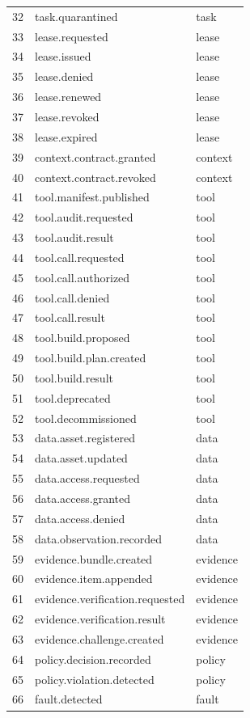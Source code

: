 \documentclass[journal,onecolumn]{IEEEtran}
\begin{document}
\begin{longtable}{p{}p{}p{}}
32 & task.quarantined & task\\
33 & lease.requested & lease\\
34 & lease.issued & lease\\
35 & lease.denied & lease\\
36 & lease.renewed & lease\\
37 & lease.revoked & lease\\
38 & lease.expired & lease\\
39 & context.contract.granted & context\\
40 & context.contract.revoked & context\\
41 & tool.manifest.published & tool\\
42 & tool.audit.requested & tool\\
43 & tool.audit.result & tool\\
44 & tool.call.requested & tool\\
45 & tool.call.authorized & tool\\
46 & tool.call.denied & tool\\
47 & tool.call.result & tool\\
48 & tool.build.proposed & tool\\
49 & tool.build.plan.created & tool\\
50 & tool.build.result & tool\\
51 & tool.deprecated & tool\\
52 & tool.decommissioned & tool\\
53 & data.asset.registered & data\\
54 & data.asset.updated & data\\
55 & data.access.requested & data\\
56 & data.access.granted & data\\
57 & data.access.denied & data\\
58 & data.observation.recorded & data\\
59 & evidence.bundle.created & evidence\\
60 & evidence.item.appended & evidence\\
61 & evidence.verification.requested & evidence\\
62 & evidence.verification.result & evidence\\
63 & evidence.challenge.created & evidence\\
64 & policy.decision.recorded & policy\\
65 & policy.violation.detected & policy\\
66 & fault.detected & fault\\

\end{longtable}
\end{document}
